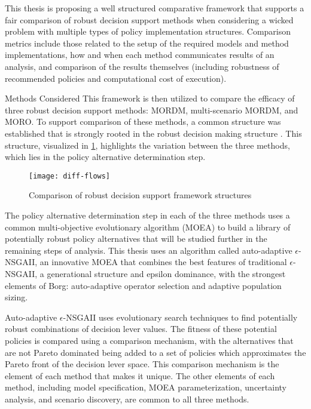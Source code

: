 This thesis is proposing a well structured comparative framework that supports a fair comparison of robust decision support methods when considering a wicked problem with multiple types of policy implementation structures. Comparison metrics include those related to the setup of the required models and method implementations, how and when each method communicates results of an analysis, and comparison of the results themselves (including robustness of recommended policies and computational cost of execution). 

\vspace{\baselineskip}
{\Large {\color{title}Methods Considered}} 
\vspace{0.5\baselineskip} \newline
This framework is then utilized to compare the efficacy of three robust decision support methods: MORDM, multi-scenario MORDM, and MORO. To support comparison of these methods, a common structure was established that is strongly rooted in the robust decision making structure \citep{Lempert2006}. This structure, visualized in \cref{fig:diff-flows-summary}, highlights the variation between the three methods, which lies in the policy alternative determination step. 

\begin{figure}[ht]
    \centering
    \captionsetup{justification=centering}
    
    \texttt{[image: diff-flows]}
    \caption{Comparison of robust decision support framework structures}
    \label{fig:diff-flows-summary}
\end{figure}

The policy alternative determination step in each of the three methods uses a common multi-objective evolutionary algorithm (MOEA) to build a library of potentially robust policy alternatives that will be studied further in the remaining steps of analysis. This thesis uses an algorithm called auto-adaptive $\epsilon$-NSGAII, an innovative MOEA that combines the best features of traditional $\epsilon$-NSGAII, a generational structure and epsilon dominance, with the strongest elements of Borg: auto-adaptive operator selection and adaptive population sizing.

Auto-adaptive $\epsilon$-NSGAII uses evolutionary search techniques to find potentially robust combinations of decision lever values. The fitness of these potential policies is compared using a comparison mechanism, with the alternatives that are not Pareto dominated being added to a set of policies which approximates the Pareto front of the decision lever space. This comparison mechanism is the element of each method that makes it unique. The other elements of each method, including model specification, MOEA parameterization, uncertainty analysis, and scenario discovery, are common to all three methods. 

